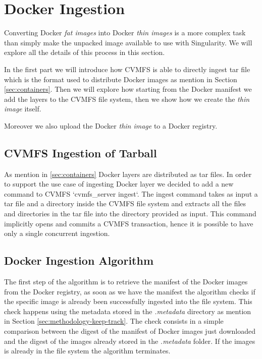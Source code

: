 \section{Docker Ingestion}

Converting Docker \textit{fat images} into Docker \textit{thin images} is a
more complex task than simply make the unpacked image available to use with
Singularity. We will explore all the details of this process in this section.

In the first part we will introduce how CVMFS is able to directly ingest tar
file which is the format used to distribute Docker images as mention in Section
\ref{sec:containers}. Then we will explore how starting from the Docker manifest
we add the layers to the CVMFS file system, then we show how we create the
\textit{thin image} itself.

Moreover we also upload the Docker \textit{thin image} to a Docker registry.

\subsection{CVMFS Ingestion of Tarball}

As mention in \ref{sec:containers} Docker layers are distributed as tar files.
In order to support the use case of ingesting Docker layer we decided to add a
new command to CVMFS `cvmfs\_server ingest`. The ingest command takes as input
a tar file and a directory inside the CVMFS file system and extracts all the
files and directories in the tar file into the directory provided as input. This
command implicitly opens and commits a CVMFS transaction, hence it is possible to
have only a single concurrent ingestion.

\subsection{Docker Ingestion Algorithm}

The first step of the algorithm is to retrieve the manifest of the Docker
images from the Docker registry, as soon as we have the manifest the algorithm
checks if the specific image is already been successfully ingested into the
file system.  This check happens using the metadata stored in the
\textit{.metadata} directory as mention in Section \ref{sec:methodology-keep-track}.
The check consists in a simple comparison between the digest of the manifest of
Docker images just downloaded and the digest of the images already stored in
the \textit{.metadata} folder. If the images is already in the file system the
algorithm terminates.

